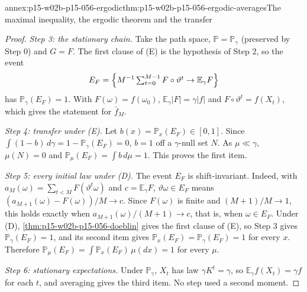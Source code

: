 \begin{annexitem}{annex:p15-w02b-p15-056-ergodic}{thm:p15-w02b-p15-056-ergodic-averages}{The maximal inequality, the ergodic theorem and the transfer}
\begin{proof}
\emph{Step 3: the stationary chain.} Take the path space,
\(\mathbb P=\mathbb P_\gamma\) (preserved by Step 0) and \(G=F\). The
first clause of (E) is the hypothesis of Step 2, so the event
\[
 E_F=\Bigl\{M^{-1}\textstyle\sum_{t=0}^{M-1}F\circ\vartheta^t\to\mathbb E_\gamma F\Bigr\}
\]
has \(\mathbb P_\gamma(E_F)=1\). With \(F(\omega)=f(\omega_0)\),
\(\mathbb E_\gamma|F|=\gamma|f|\) and \(F\circ\vartheta^t=f(X_t)\), which
gives the statement for \(\bar f_M\).

\emph{Step 4: transfer under (E).} Let \(b(x)=\mathbb P_x(E_F)\in[0,1]\).
Since \(\int(1-b)\,d\gamma=1-\mathbb P_\gamma(E_F)=0\), \(b=1\) off a
\(\gamma\)-null set \(N\). As \(\mu\ll\gamma\), \(\mu(N)=0\) and
\(\mathbb P_\mu(E_F)=\int b\,d\mu=1\). This proves the first item.

\emph{Step 5: every initial law under (D).} The event \(E_F\) is
shift-invariant. Indeed, with \(a_M(\omega)=\sum_{t<M}F(\vartheta^t\omega)\)
and \(c=\mathbb E_\gamma F\), \(\vartheta\omega\in E_F\) means
\((a_{M+1}(\omega)-F(\omega))/M\to c\). Since \(F(\omega)\) is finite and
\((M+1)/M\to1\), this holds exactly when \(a_{M+1}(\omega)/(M+1)\to c\),
that is, when \(\omega\in E_F\). Under (D),
\cref{thm:p15-w02b-p15-056-doeblin} gives the first clause of (E), so
Step 3 gives \(\mathbb P_\gamma(E_F)=1\), and its second item gives
\(\mathbb P_x(E_F)=\mathbb P_\gamma(E_F)=1\) for every \(x\). Therefore
\(\mathbb P_\mu(E_F)=\int\mathbb P_x(E_F)\,\mu(dx)=1\) for every
\(\mu\).

\emph{Step 6: stationary expectations.} Under \(\mathbb P_\gamma\), \(X_t\)
has law \(\gamma K^t=\gamma\), so \(\mathbb E_\gamma f(X_t)=\gamma f\) for
each \(t\), and averaging gives the third item. No step used a second
moment.
\end{proof}
\end{annexitem}

